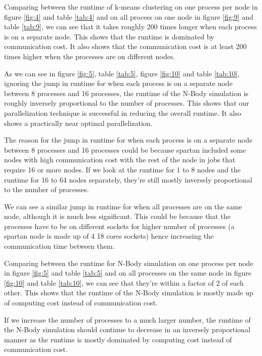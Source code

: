 \documentclass{article}
\begin{document}
Comparing between the runtime of k-means clustering on one process per node in figure \ref{fig:4}
and table \ref{tab:4} and on all process on one node in figure \ref{fig:9} and table \ref{tab:9}, we
can see that it takes roughly 200 times longer when each process is on a separate node. This shows
that the runtime is dominated by communication cost. It also shows that the communication cost is at
least 200 times higher when the processes are on different nodes.

As we can see in figure \ref{fig:5}, table \ref{tab:5}, figure \ref{fig:10} and table \ref{tab:10},
ignoring the jump in runtime for when each process is on a separate node between 8 processes and 16
processes, the runtime of the N-Body simulation is roughly inversely proportional to the number of
processes. This shows that our parallelization technique is successful in reducing the overall
runtime. It also shows a practically near optimal parallelization.

The reason for the jump in runtime for when each process is on a separate node between 8 processes
and 16 processes could be because spartan included some nodes with high communication cost with the
rest of the node in jobs that require 16 or more nodes. If we look at the runtime for 1 to 8 nodes
and the runtime for 16 to 64 nodes separately, they're still mostly inversely proportional to the
number of processes.

We can see a similar jump in runtime for when all processes are on the same node, although it is
much less significant. This could be because that the processes have to be on different sockets for
higher number of processes (a spartan node is made up of 4 18 cores sockets) hence increasing the
communication time between them.

Comparing between the runtime for N-Body simulation on one process per node in figure \ref{fig:5}
and table \ref{tab:5} and on all processes on the same node in figure \ref{fig:10} and table
\ref{tab:10}, we can see that they're within a factor of 2 of each other. This shows that the
runtime of the N-Body simulation is mostly made up of computing cost instead of communication cost.

If we increase the number of processes to a much larger number, the runtime of the N-Body simulation
should continue to decrease in an inversely proportional manner as the runtime is mostly dominated
by computing cost instead of communication cost.
\end{document}
